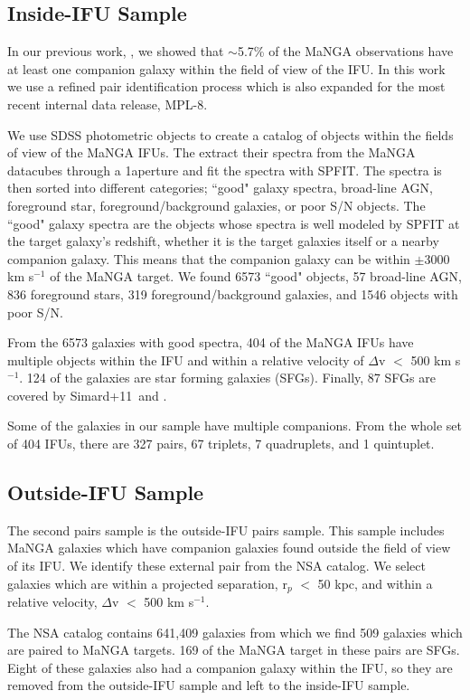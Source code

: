 \documentclass[iop,revtex4,twocolumn,apj,numberedappendix,appendixfloats]{emulateapj}
\newcommand{\simard}{Simard+11}
\begin{document}
\subsection{Inside-IFU Sample}\label{sec:inside}
In our previous work, \citet{Fu:2018}, we showed that $\sim$5.7\% of the MaNGA observations have at least one companion galaxy within the field of view of the IFU. In this work we use a refined pair identification process which is also expanded for the most recent internal data release, MPL-8.

We use SDSS photometric objects to create a catalog of objects within the fields of view of the MaNGA IFUs. The extract their spectra from the MaNGA datacubes through a 1\arcsec aperture and fit the spectra with {\sc SPFIT}. The spectra is then sorted into different categories; ``good" galaxy spectra, broad-line AGN, foreground star, foreground/background galaxies, or poor S/N objects. The ``good" galaxy spectra are the objects whose spectra is well modeled by {\sc SPFIT} at the target galaxy's redshift, whether it is the target galaxies itself or a nearby companion galaxy. This means that the companion galaxy can be within $\pm$3000 km s$^{-1}$ of the MaNGA target. We found 6573 ``good" objects, 57 broad-line AGN, 836 foreground stars, 319 foreground/background galaxies, and 1546 objects with poor S/N. 

From the 6573 galaxies with good spectra, 404 of the MaNGA IFUs have multiple objects within the IFU and within a relative velocity of $\Delta$v $<$ 500 km s$^{-1}$. 124 of the galaxies are star forming galaxies (SFGs). Finally, 87 SFGs are covered by \simard\ and \citet{Mendel:2014}. 

Some of the galaxies in our sample have multiple companions. From the whole set of 404 IFUs, there are 327 pairs, 67 triplets, 7 quadruplets, and 1 quintuplet.  


\subsection{Outside-IFU Sample}\label{sec:outside}

The second pairs sample is the outside-IFU pairs sample. This sample includes MaNGA galaxies which have companion galaxies found outside the field of view of its IFU. We identify these external pair from the NSA catalog. We select galaxies which are within a projected separation, r$_p$ $<$ 50 kpc, and within a relative velocity, $\Delta$v $<$ 500 km s$^{-1}$. 

The NSA catalog contains 641,409 galaxies from which we find 509 galaxies which are paired to MaNGA targets. 169 of the MaNGA target in these pairs are SFGs. Eight of these galaxies also had a companion galaxy within the IFU, so they are removed from the outside-IFU sample and left to the inside-IFU sample. 
\end{document}
